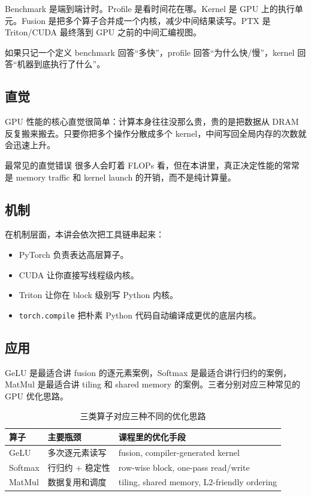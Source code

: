 Benchmark 是端到端计时。Profile 是看时间花在哪。Kernel 是 GPU 上的执行单元。Fusion 是把多个算子合并成一个内核，减少中间结果读写。PTX 是 Triton/CUDA 最终落到 GPU 之前的中间汇编视图。

\begin{importantbox}{如果只记一个定义}
benchmark 回答“多快”，profile 回答“为什么快/慢”，kernel 回答“机器到底执行了什么”。
\end{importantbox}

\subsection{直觉}

GPU 性能的核心直觉很简单：计算本身往往没那么贵，贵的是把数据从 DRAM 反复搬来搬去。只要你把多个操作分散成多个 kernel，中间写回全局内存的次数就会迅速上升。

\begin{warningbox}{最常见的直觉错误}
很多人会盯着 FLOPs 看，但在本讲里，真正决定性能的常常是 memory traffic 和 kernel launch 的开销，而不是纯计算量。
\end{warningbox}

\subsection{机制}

在机制层面，本讲会依次把工具链串起来：
\begin{itemize}
    \item PyTorch 负责表达高层算子。
    \item CUDA 让你直接写线程级内核。
    \item Triton 让你在 block 级别写 Python 内核。
    \item \texttt{torch.compile} 把朴素 Python 代码自动编译成更优的底层内核。
\end{itemize}

\subsection{应用}

GeLU 是最适合讲 fusion 的逐元素案例，Softmax 是最适合讲行归约的案例，MatMul 是最适合讲 tiling 和 shared memory 的案例。三者分别对应三种常见的 GPU 优化思路。

\begin{table}[H]
\centering
\begin{tabular}{p{3.2cm}p{3.8cm}p{5.4cm}}
\toprule
\textbf{算子} & \textbf{主要瓶颈} & \textbf{课程里的优化手段} \\
\midrule
GeLU & 多次逐元素读写 & fusion, compiler-generated kernel \\
Softmax & 行归约 + 稳定性 & row-wise block, one-pass read/write \\
MatMul & 数据复用和调度 & tiling, shared memory, L2-friendly ordering \\
\bottomrule
\end{tabular}
\caption{三类算子对应三种不同的优化思路}
\end{table}


